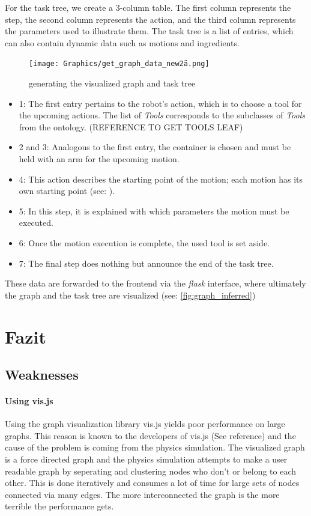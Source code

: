 For the task tree, we create a 3-column table. The first column represents the step, the second column represents the action, and the third column represents the parameters used to illustrate them. The task tree is a list of entries, which can also contain dynamic data such as motions and ingredients.
\begin{figure}[H]
    \texttt{[image: Graphics/get\_graph\_data\_new2ä.png]}
    \caption{generating the visualized graph and task tree}
\end{figure}

\begin{itemize}
    \item 1: The first entry pertains to the robot's action, which is to choose a tool for the upcoming actions. The list of \textit{Tools} corresponds to the subclasses of \textit{Tools} from the ontology. (REFERENCE TO GET TOOLS LEAF)
    \item 2 and 3: Analogous to the first entry, the container is chosen and must be held with an arm for the upcoming motion.
    \item 4: This action describes the starting point of the motion; each motion has its own starting point (see: ).
    \item 5: In this step, it is explained with which parameters the motion must be executed.
    \item 6: Once the motion execution is complete, the used tool is set aside.
    \item 7: The final step does nothing but announce the end of the task tree.
    \end{itemize}

These data are forwarded to the frontend via the \textit{flask} interface, where ultimately the graph and the task tree are visualized (see: \ref{fig:graph_inferred})

\section{Fazit}

\subsection{Weaknesses}

\paragraph{Using vis.js}
Using the graph visualization library vis.js yields poor performance on large graphs.
This reason is known to the developers of vis.js (See reference) and the cause of the problem is coming
from the physics simulation. The visualized graph is a force directed graph and the physics simulation attempts to make a user readable graph 
by seperating and clustering nodes who don't or belong to each other. This is done iteratively and consumes a lot of time for large sets of nodes
connected via many edges. The more interconnected the graph is the more terrible the performance gets. 

